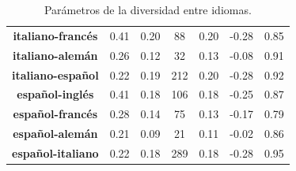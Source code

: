 \begin{table}[h!]
\begin{tabular}{ccccccc}
		\textbf{italiano-francés} & 0.41           & 0.20                & 88                    & 0.20           & -0.28         & 0.85        \\
		\textbf{italiano-alemán}  & 0.26           & 0.12                & 32                    & 0.13           & -0.08         & 0.91        \\
		\textbf{italiano-español}  & 0.22          & 0.19                & 212                    & 0.20           & -0.28         & 0.92       \\
		\textbf{español-inglés}  & 0.41          & 0.18                & 106                   & 0.18           & -0.25        & 0.87        \\
		\textbf{español-francés}   & 0.28           & 0.14                & 75                   & 0.13           & -0.17         & 0.79        \\
		\textbf{español-alemán} & 0.21           & 0.09                & 21                    & 0.11           & -0.02         & 0.86        \\
		\textbf{español-italiano}  & 0.22          & 0.18                & 289                    & 0.18           & -0.28         & 0.95       
	\end{tabular}
	\caption{Parámetros de la diversidad entre idiomas.}
	\label{tab.DR_EN}
\end{table}


